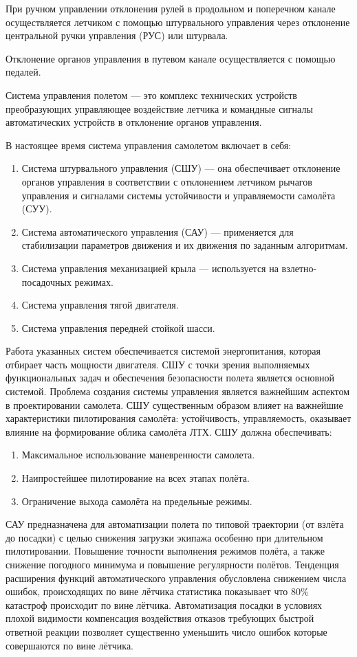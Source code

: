 \documentclass{article}
\begin{document}
При ручном управлении отклонения рулей в продольном и поперечном канале
осуществляется летчиком с помощью штурвального управления через отклонение
центральной ручки управления (РУС) или штурвала.

Отклонение органов управления в путевом канале осуществляется с помощью
педалей.

Система управления полетом --- это комплекс технических устройств преобразующих
управляющее воздействие летчика и командные сигналы автоматических устройств в
отклонение органов управления.

В настоящее время система управления самолетом включает в себя:
\begin{enumerate}
    \item Система штурвального управления (СШУ) --- она обеспечивает отклонение
        органов управления в соответствии с отклонением летчиком рычагов
        управления и сигналами системы устойчивости и управляемости самолёта
        (СУУ).
    \item Система автоматического управления (САУ) --- применяется для
        стабилизации параметров движения и их движения по заданным алгоритмам.
    \item Система управления механизацией крыла --- используется на
        взлетно-посадочных режимах.
    \item Система управления тягой двигателя.
    \item Система управления передней стойкой шасси.
\end{enumerate}

Работа указанных систем обеспечивается системой энергопитания, которая отбирает
часть мощности двигателя. СШУ с точки зрения выполняемых функциональных задач и
обеспечения безопасности полета является основной системой. Проблема создания
системы управления является важнейшим аспектом в проектировании самолета. СШУ
существенным образом влияет на важнейшие характеристики пилотирования самолёта:
устойчивость, управляемость, оказывает влияние на формирование облика самолёта
ЛТХ. СШУ должна обеспечивать:
\begin{enumerate}
    \item Максимальное использование маневренности самолета.
    \item Наипростейшее пилотирование на всех этапах полёта.
    \item Ограничение выхода самолёта на предельные режимы.
\end{enumerate}

САУ предназначена для автоматизации полета по типовой траектории (от взлёта до
посадки) с целью снижения загрузки экипажа особенно при длительном
пилотировании. Повышение точности выполнения режимов полёта, а также снижение
погодного минимума и повышение регулярности полётов. Тенденция расширения
функций автоматического управления обусловлена снижением числа ошибок,
происходящих по вине лётчика статистика показывает что 80\% катастроф
происходит по вине лётчика. Автоматизация посадки в условиях плохой видимости
компенсация воздействия отказов требующих быстрой ответной реакции позволяет
существенно уменьшить число ошибок которые совершаются по вине лётчика.
\end{document}
